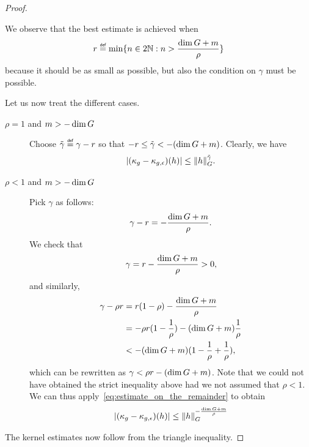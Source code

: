 \begin{proof}
\begin{description}
            We observe that the best estimate is achieved when
            \begin{align*}
                r \defeq \min \{n \in 2 \N : n > \frac{\dim \Group + m} \rho \}
            \end{align*}
            because it should be as small as possible,
            but also the condition on $\gamma$ must be possible.

            Let us now treat the different cases.
            \begin{description}
                \item[$\rho = 1$ and $m > -\dim \Group$]
                    Choose $\tilde \gamma \defeq \gamma - r$
                    so that $-r \leq \tilde \gamma < -(\dim \Group + m)$.
                    Clearly, we have
                    \begin{align*}
                        \abs{(\kappa_g - \kappa_{g, \epsilon})(h)}
                        \leq \norm [\Group] h^{\tilde \gamma}.
                    \end{align*}
                \item[$\rho < 1$ and $m > -\dim \Group$]
                    Pick $\gamma$ as follows:
                    \begin{align*}
                        \gamma - r = -\frac{\dim \Group + m} \rho.
                    \end{align*}
                    We check that
                    \begin{align*}
                        \gamma = r - \frac {\dim \Group + m} \rho > 0,
                    \end{align*}
                    and similarly,
                    \begin{align*}
                        \gamma - \rho r &= r(1 - \rho) - \frac {\dim \Group + m} \rho\\
                        &= -\rho r(1 - \frac 1 \rho) - (\dim \Group + m) \frac 1 \rho\\
                        &< -(\dim \Group + m)(1 - \frac 1 \rho + \frac 1 \rho),
                    \end{align*}
                    which can be rewritten as $\gamma < \rho r - (\dim \Group + m)$.
                    Note that we could not have obtained the strict inequality above
                    had we not assumed that $\rho < 1$.
                    We can thus apply~\eqref{eq:estimate_on_the_remainder} to obtain
                    \begin{align*}
                        \abs{(\kappa_g - \kappa_{g, \epsilon})(h)}
                        \leq \norm [\Group] h^{-\frac {\dim \Group + m} \rho}
                    \end{align*}
            \end{description}
    \end{description}
    The kernel estimates now follow from the triangle inequality.
\end{proof}

